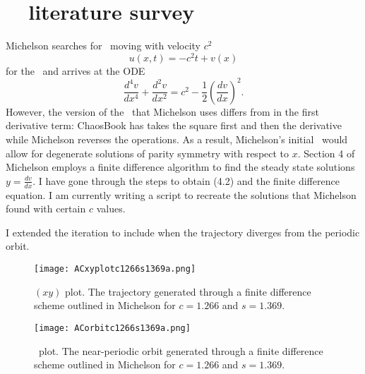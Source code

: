 \section{\KS\ \eqva\ literature survey}
\label{sect:KSeqvaLit}
\begin{description}

{Michelson searches for
\reqva\ moving with velocity $c^2$
\begin{equation}
    u(x,t) = -c^2 t + v(x)
\end{equation}
for the \KSe\ and arrives at the ODE
\begin{equation}
    \frac{d^4 v}{dx^4} + \frac{d^2 v}{dx^2} = c^2 - \frac{1}{2} \left( \frac{dv}{dx} \right)^2.
\label{ACwrongEqBlog}
\end{equation}
However, the version of the \KSe\ that Michelson uses differs from  in the first derivative term: ChaosBook has takes the square first and then the derivative while Michelson reverses the operations. As a result, Michelson's initial \KSe\ would allow for degenerate solutions of parity symmetry with respect to $x$.
Section 4 of Michelson employs a finite difference algorithm to find the
steady state solutions $y = \frac{dv}{dx}$. I have gone through the steps to
obtain (4.2) and the finite difference equation. I am currently writing a
script to recreate the solutions that Michelson found with certain $c$ values.

I extended the iteration to include when the trajectory diverges from the
periodic orbit.

\begin{figure}[h!]
  \centering
  \texttt{[image: ACxyplotc1266s1369a.png]}
  \caption{
$(xy)$ plot. The trajectory generated through a finite difference scheme
outlined in Michelson for $c=1.266$ and $s=1.369$.
  }

  \texttt{[image: ACorbitc1266s1369a.png]}
  \caption{\Statesp\ plot. The near-periodic orbit generated through a finite difference
  scheme outlined in Michelson for $c=1.266$ and $s=1.369$.}
\end{figure}
}



\end{description}
